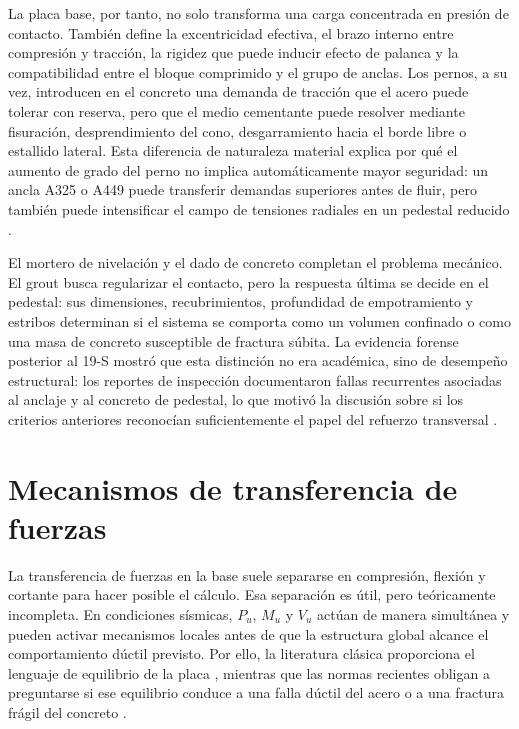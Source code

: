 La placa base, por tanto, no solo transforma una carga concentrada en presión de contacto. También define la excentricidad efectiva, el brazo interno entre compresión y tracción, la rigidez que puede inducir efecto de palanca y la compatibilidad entre el bloque comprimido y el grupo de anclas. Los pernos, a su vez, introducen en el concreto una demanda de tracción que el acero puede tolerar con reserva, pero que el medio cementante puede resolver mediante fisuración, desprendimiento del cono, desgarramiento hacia el borde libre o estallido lateral. Esta diferencia de naturaleza material explica por qué el aumento de grado del perno no implica automáticamente mayor seguridad: un ancla A325 o A449 puede transferir demandas superiores antes de fluir, pero también puede intensificar el campo de tensiones radiales en un pedestal reducido \cite{ACI318_2019, ACI318_2025, Williams_2025_ACIAnchoring}.

El mortero de nivelación y el dado de concreto completan el problema mecánico. El grout busca regularizar el contacto, pero la respuesta última se decide en el pedestal: sus dimensiones, recubrimientos, profundidad de empotramiento y estribos determinan si el sistema se comporta como un volumen confinado o como una masa de concreto susceptible de fractura súbita. La evidencia forense posterior al 19-S mostró que esta distinción no era académica, sino de desempeño estructural: los reportes de inspección documentaron fallas recurrentes asociadas al anclaje y al concreto de pedestal, lo que motivó la discusión sobre si los criterios anteriores reconocían suficientemente el papel del refuerzo transversal \cite{SMIE_2017, SSN_Puebla_2017, GCDMX_NTC_DCEA_2023}.

\section{Mecanismos de transferencia de fuerzas}

La transferencia de fuerzas en la base suele separarse en compresión, flexión y cortante para hacer posible el cálculo. Esa separación es útil, pero teóricamente incompleta. En condiciones sísmicas, $P_u$, $M_u$ y $V_u$ actúan de manera simultánea y pueden activar mecanismos locales antes de que la estructura global alcance el comportamiento dúctil previsto. Por ello, la literatura clásica proporciona el lenguaje de equilibrio de la placa \cite{FisherKloiber_2006}, mientras que las normas recientes obligan a preguntarse si ese equilibrio conduce a una falla dúctil del acero o a una fractura frágil del concreto \cite{AISC_341_2022, GCDMX_NTC_DCEA_2023}.

